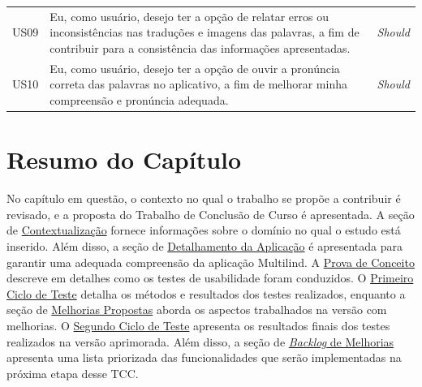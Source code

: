 \begin{table}[h!]
\begin{tabularx}{\textwidth}{p{1cm}|p{12cm}|p{1cm}}
	US09 & Eu, como usuário, desejo ter a opção de relatar erros ou inconsistências nas traduções e imagens das palavras, a fim de contribuir para a consistência das informações apresentadas.                                  & \textit{Should}      \\
	US10 & Eu, como usuário, desejo ter a opção de ouvir a pronúncia correta das palavras no aplicativo, a fim de melhorar minha compreensão e pronúncia adequada.                                                               & \textit{Should}      \\ \hline
	\end{tabularx}
\end{table}

\section{Resumo do Capítulo}
\label{sec:Resumo Proposta}
No capítulo em questão, o contexto no qual o trabalho se propõe a contribuir é revisado, e a proposta do Trabalho de Conclusão de Curso é apresentada. A seção de \hyperref[sec:Contextualização]{Contextualização} fornece informações sobre o domínio no qual o estudo está inserido. Além disso, 
a seção de \hyperref[sec:Detalhamento da Aplicacao]{Detalhamento da Aplicação} é apresentada para garantir uma adequada compreensão da aplicação Multilind. A \hyperref[sec:Prova de Conceito]{Prova de Conceito} descreve em detalhes como os testes de usabilidade foram conduzidos. O \hyperref[sec:Primeiro Ciclo]{Primeiro Ciclo de Teste} 
detalha os métodos e resultados dos testes realizados, enquanto a seção de \hyperref[sec:Melhorias Propostas]{Melhorias Propostas} aborda os aspectos trabalhados na versão com melhorias. O \hyperref[sec:Segundo Ciclo]{Segundo Ciclo de Teste} apresenta os resultados finais dos testes realizados na versão aprimorada. 
Além disso, a seção de \hyperref[sec:Backlog de Melhorias]{\textit{Backlog} de Melhorias} apresenta uma lista priorizada das funcionalidades que serão implementadas na próxima etapa desse TCC. 